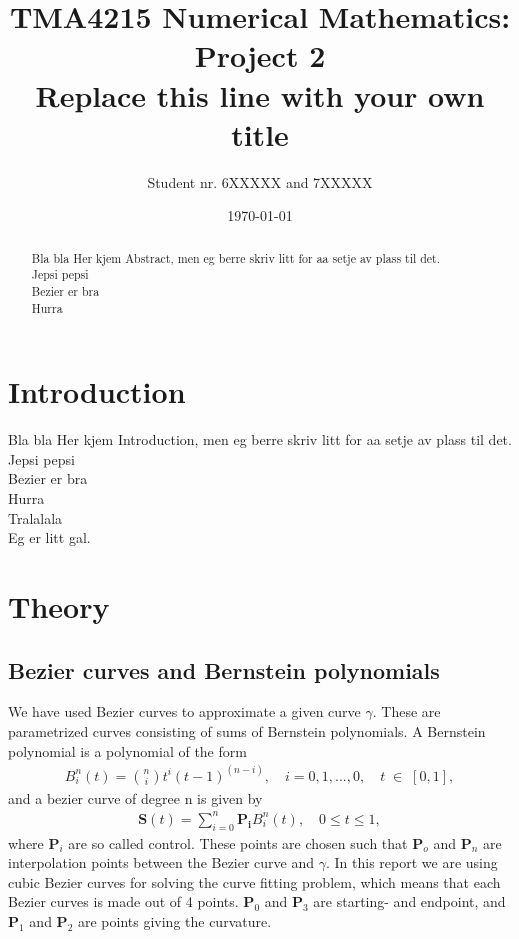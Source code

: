 \documentclass[10pt]{article}
\title{TMA4215 Numerical Mathematics: Project 2 \\ Replace this line with your own title}
\author{Student nr. 6XXXXX and 7XXXXX} %
\date{\today}
\begin{document}
\maketitle
\begin{abstract}

Bla bla Her kjem Abstract, men eg berre skriv litt for aa setje av plass til det. \\
Jepsi pepsi \\
Bezier er bra \\
Hurra \\

\end{abstract}

\section{Introduction} 

Bla bla Her kjem Introduction, men eg berre skriv litt for aa setje av plass til det. \\
Jepsi pepsi \\
Bezier er bra \\
Hurra \\
Tralalala \\
Eg er litt gal. \\

\section{Theory}

\subsection*{Bezier curves and Bernstein polynomials}

We have used Bezier curves to approximate a given curve $\gamma$. These are parametrized curves consisting of sums of Bernstein polynomials. A Bernstein polynomial is a polynomial of the form
\begin{align}
B_{i}^n(t) = \binom{n}{i}t^i(t-1)^{(n-i)},\quad i = 0, 1, ..., 0,\quad t \; \in \; [0,1],
\end{align}
and a bezier curve of degree n is given by
\begin{align}
\mathbf{S}(t) = \sum_{i=0}^{n} \mathbf{P_i} B_{i}^n(t), \quad 0 \leq t \leq 1,
\end{align}
where $\mathbf{P}_i$ are so called control. These points are chosen such that $\mathbf{P}_o$ and $\mathbf{P}_n$ are interpolation points between the Bezier curve and $\gamma$. In this report we are using cubic Bezier curves for solving the curve fitting problem, which means that each Bezier curves is made out of 4 points. $\mathbf{P}_0$ and $\mathbf{P}_3$ are starting- and endpoint, and $\mathbf{P}_1$ and $\mathbf{P}_2$ are points giving the curvature.
\end{document}
